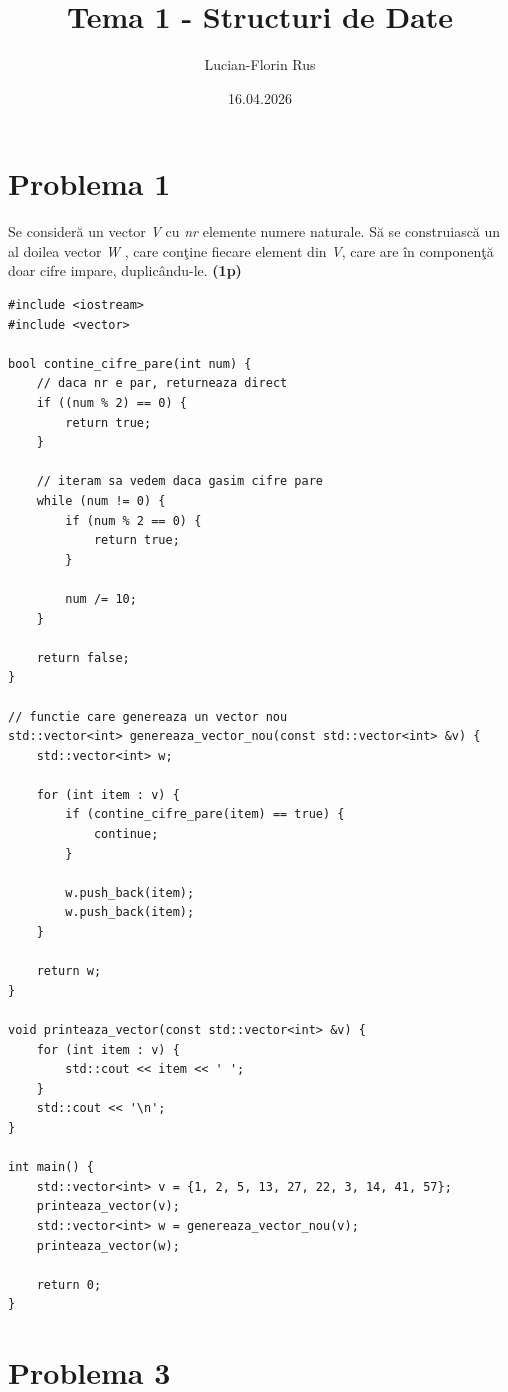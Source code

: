 \documentclass[12pt]{book}
\title{Tema 1 - Structuri de Date}
\author{Lucian-Florin Rus}
\date{16.04.2026}
\begin{document}
\maketitle

\section*{Problema 1}
Se consideră un vector \textit{V} cu \textit{nr} elemente numere naturale. Să se construiască un al doilea vector\textit{ W} , care conţine fiecare element din \textit{V}, care are în componenţă doar cifre impare, duplicându-le. \textbf{(1p)}\newline

\begin{lstlisting}
#include <iostream>
#include <vector>

bool contine_cifre_pare(int num) {
    // daca nr e par, returneaza direct
    if ((num % 2) == 0) {
        return true;
    }

    // iteram sa vedem daca gasim cifre pare
    while (num != 0) {
        if (num % 2 == 0) {
            return true;
        }

        num /= 10;
    }

    return false;
}

// functie care genereaza un vector nou
std::vector<int> genereaza_vector_nou(const std::vector<int> &v) {
    std::vector<int> w;

    for (int item : v) {
        if (contine_cifre_pare(item) == true) {
            continue;
        }

        w.push_back(item);
        w.push_back(item);
    }

    return w;
}

void printeaza_vector(const std::vector<int> &v) {
    for (int item : v) {
        std::cout << item << ' ';
    }
    std::cout << '\n';
}

int main() {
    std::vector<int> v = {1, 2, 5, 13, 27, 22, 3, 14, 41, 57};
    printeaza_vector(v);
    std::vector<int> w = genereaza_vector_nou(v);
    printeaza_vector(w);

    return 0;
}
\end{lstlisting}

\newpage

\section*{Problema 3}
\end{document}
